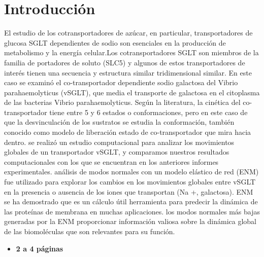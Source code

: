 \chapter*{Introducci\'{o}n}
El estudio de los cotransportadores de az\'{u}car, en particular, transportadores de glucosa SGLT dependientes de sodio son esenciales en la producci\'{o}n de metabolismo y la energ\'{i}a celular.Los cotransportadores SGLT son miembros de la familia de portadores de soluto (SLC5) y algunos de estos transportadores de inter\'{e}s tienen una secuencia y estructura similar tridimensional similar. En este caso se examin\'{o} el  co-transportador dependiente  sodio galactosa del Vibrio parahaemolyticus (vSGLT), que media el transporte de galactosa en el citoplasma de las bacterias Vibrio parahaemolyticus. Seg\'{u}n la literatura, la cin\'{e}tica del co-transportador tiene entre 5 y 6 estados o conformaciones, pero en este caso de que la desvinculaci\'{o}n de los sustratos se estudia la conformaci\'{o}n, tambi\'{e}n conocido como modelo de liberaci\'{o}n estado de co-transportador que mira hacia dentro. se realiz\'{o} un estudio computacional para analizar los movimientos globales de un transportador vSGLT, y comparamos nuestros resultados computacionales con los que se encuentran en los anteriores informes experimentales. an\'{a}lisis de modos normales con un modelo el\'{a}stico de red (ENM) fue utilizado para explorar los cambios en los movimientos globales entre vSGLT en la presencia o ausencia de los iones que transportan (Na +, galactosa). ENM se ha demostrado que es un c\'{a}lculo \'{u}til herramienta para predecir la din\'{a}mica de las prote\'{i}nas de membrana en muchas aplicaciones. los modos normales m\'{a}s bajas generadas por la ENM proporcionar informaci\'{o}n valiosa sobre la din\'{a}mica global de las biomol\'{e}culas que son relevantes para su funci\'{o}n.\\
\begin{itemize}
\item \textbf{2 a 4 p\'{a}ginas}
\end{itemize}
